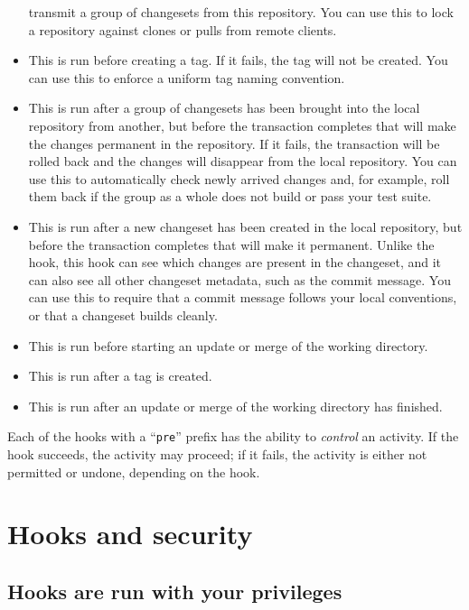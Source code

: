 \begin{itemize}
  transmit a group of changesets from this repository.  You can use
  this to lock a repository against clones or pulls from remote
  clients.
\item[\small\hook{pretag}] This is run before creating a tag.  If it
  fails, the tag will not be created.  You can use this to enforce a
  uniform tag naming convention.
\item[\small\hook{pretxnchangegroup}] This is run after a group of
  changesets has been brought into the local repository from another,
  but before the transaction completes that will make the changes
  permanent in the repository.  If it fails, the transaction will be
  rolled back and the changes will disappear from the local
  repository.  You can use this to automatically check newly arrived
  changes and, for example, roll them back if the group as a whole
  does not build or pass your test suite.
\item[\small\hook{pretxncommit}] This is run after a new changeset has
  been created in the local repository, but before the transaction
  completes that will make it permanent.  Unlike the 
  hook, this hook can see which changes are present in the changeset,
  and it can also see all other changeset metadata, such as the commit
  message.  You can use this to require that a commit message follows
  your local conventions, or that a changeset builds cleanly.
\item[\small\hook{preupdate}] This is run before starting an update or
  merge of the working directory.
\item[\small\hook{tag}] This is run after a tag is created.
\item[\small\hook{update}] This is run after an update or merge of the
  working directory has finished.
\end{itemize}
Each of the hooks with a ``\texttt{pre}'' prefix has the ability to
\emph{control} an activity.  If the hook succeeds, the activity may
proceed; if it fails, the activity is either not permitted or undone,
depending on the hook.

\section{Hooks and security}

\subsection{Hooks are run with your privileges}

